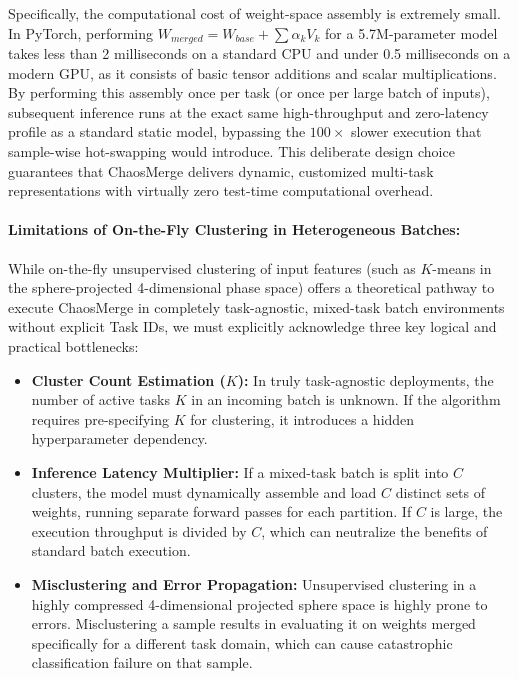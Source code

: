 Specifically, the computational cost of weight-space assembly is extremely small. In PyTorch, performing $W_{merged} = W_{base} + \sum \alpha_k V_k$ for a 5.7M-parameter model takes less than 2 milliseconds on a standard CPU and under 0.5 milliseconds on a modern GPU, as it consists of basic tensor additions and scalar multiplications. By performing this assembly once per task (or once per large batch of inputs), subsequent inference runs at the exact same high-throughput and zero-latency profile as a standard static model, bypassing the $100\times$ slower execution that sample-wise hot-swapping would introduce. This deliberate design choice guarantees that ChaosMerge delivers dynamic, customized multi-task representations with virtually zero test-time computational overhead.

\paragraph{Limitations of On-the-Fly Clustering in Heterogeneous Batches:}
While on-the-fly unsupervised clustering of input features (such as $K$-means in the sphere-projected 4-dimensional phase space) offers a theoretical pathway to execute ChaosMerge in completely task-agnostic, mixed-task batch environments without explicit Task IDs, we must explicitly acknowledge three key logical and practical bottlenecks:
\begin{itemize}
    \item \textbf{Cluster Count Estimation ($K$):} In truly task-agnostic deployments, the number of active tasks $K$ in an incoming batch is unknown. If the algorithm requires pre-specifying $K$ for clustering, it introduces a hidden hyperparameter dependency.
    \item \textbf{Inference Latency Multiplier:} If a mixed-task batch is split into $C$ clusters, the model must dynamically assemble and load $C$ distinct sets of weights, running separate forward passes for each partition. If $C$ is large, the execution throughput is divided by $C$, which can neutralize the benefits of standard batch execution.
    \item \textbf{Misclustering and Error Propagation:} Unsupervised clustering in a highly compressed 4-dimensional projected sphere space is highly prone to errors. Misclustering a sample results in evaluating it on weights merged specifically for a different task domain, which can cause catastrophic classification failure on that sample.
\end{itemize}

